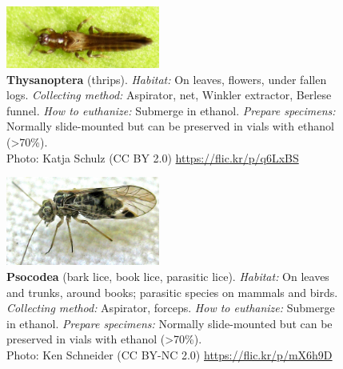\documentclass[letterpaper, 11pt]{article}
\begin{document}
\clearpage

\begin{figure}
  \caption{\textbf{Thysanoptera} (thrips). \textit{Habitat:} On leaves, flowers, under fallen logs. \textit{Collecting method:} Aspirator, net, Winkler extractor, Berlese funnel. \textit{How to euthanize:} Submerge in ethanol. \textit{Prepare specimens:} Normally slide-mounted but can be preserved in vials with ethanol (\textgreater70\%).\\ Photo: Katja Schulz (CC BY 2.0) \url{https://flic.kr/p/q6LxBS}}
  \includegraphics[width=0.45\textwidth]{Thysanoptera}
\end{figure}

\begin{figure}
  \caption{\textbf{Psocodea} (bark lice, book lice, parasitic lice). \textit{Habitat:} On leaves and trunks, around books; parasitic species on mammals and birds. \textit{Collecting method:} Aspirator, forceps. \textit{How to euthanize:} Submerge in ethanol. \textit{Prepare specimens:} Normally slide-mounted but can be preserved in vials with ethanol (\textgreater70\%).\\ Photo: Ken Schneider (CC BY-NC 2.0) \url{https://flic.kr/p/mX6h9D}}
  \includegraphics[width=0.45\textwidth]{PsocodeaBark}
\end{figure}
\end{document}
